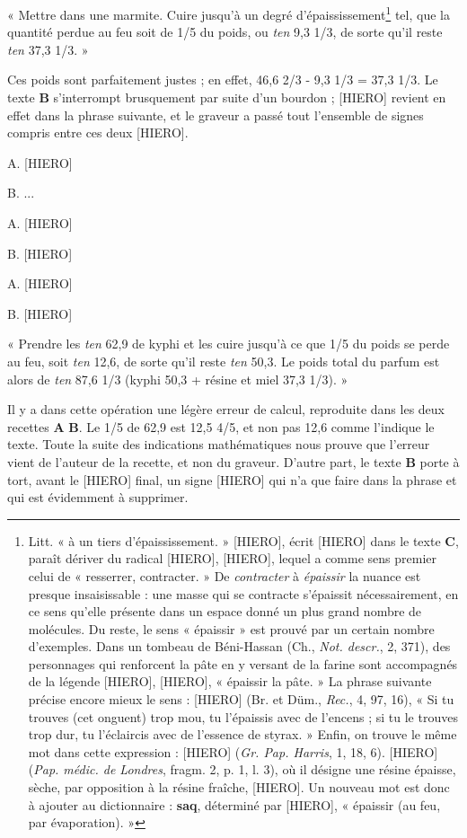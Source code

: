 \documentclass[a4paper, 11pt, oneside, landscape]{article}
\begin{document}
« Mettre dans une marmite. Cuire jusqu'à un degré d'épaississement\footnote{Litt. « à un tiers d'épaississement. » [HIERO], écrit [HIERO] dans le texte \textbf{C}, paraît dériver du radical [HIERO], [HIERO], lequel a comme sens premier celui de « resserrer, contracter. » De \emph{contracter} à \emph{épaissir} la nuance est presque insaisissable : une masse qui se contracte s'épaissit nécessairement, en ce sens qu'elle présente dans un espace donné un plus grand nombre de molécules. Du reste, le sens « épaissir » est prouvé par un certain nombre d'exemples. Dans un tombeau de Béni-Hassan (Ch., \emph{Not. descr.}, 2, 371), des personnages qui renforcent la pâte en y versant de la farine sont accompagnés de la légende [HIERO], [HIERO], « épaissir la pâte. » La phrase suivante précise encore mieux le sens : [HIERO] (Br. et Düm., \emph{Rec.}, 4, 97, 16), « Si tu trouves (cet onguent) trop mou, tu l'épaissis avec de l'encens ; si tu le trouves trop dur, tu l'éclaircis avec de l'essence de styrax. » Enfin, on trouve le même mot dans cette expression : [HIERO] (\emph{Gr. Pap. Harris}, 1, 18, 6). [HIERO] (\emph{Pap. médic. de Londres}, fragm. 2, p. 1, l. 3), où il désigne une résine épaisse, sèche, par opposition à la résine fraîche, [HIERO]. Un nouveau mot est donc à ajouter au dictionnaire : \textbf{saq}, déterminé par [HIERO], « épaissir (au feu, par évaporation). »} tel, que la quantité perdue au feu soit de 1/5 du poids, ou \emph{ten} 9,3 1/3, de sorte qu'il reste \emph{ten} 37,3 1/3. »

Ces poids sont parfaitement justes ; en effet, 46,6 2/3 - 9,3 1/3 = 37,3 1/3. Le texte \textbf{B} s'interrompt brusquement par suite d'un bourdon ; [HIERO] revient en effet dans la phrase suivante, et le graveur a passé tout l'ensemble de signes compris entre ces deux [HIERO]. 

A. [HIERO]

B. ...

A. [HIERO]

B. [HIERO]

A. [HIERO]

B. [HIERO]

« Prendre les \emph{ten} 62,9 de kyphi et les cuire jusqu'à ce que 1/5 du poids se perde au feu, soit \emph{ten} 12,6, de sorte qu'il reste \emph{ten} 50,3. Le poids total du parfum est alors de \emph{ten} 87,6 1/3 (kyphi 50,3 + résine et miel 37,3 1/3). »

Il y a dans cette opération une légère erreur de calcul, reproduite dans les deux recettes \textbf{A} \textbf{B}. Le 1/5 de 62,9 est 12,5 4/5, et non pas 12,6 comme l'indique le texte. Toute la suite des indications mathématiques nous prouve que l'erreur vient de l'auteur de la recette, et non du graveur. D'autre part, le texte \textbf{B} porte à tort, avant le [HIERO] final, un signe [HIERO] qui n'a que faire dans la phrase et qui est évidemment à supprimer.
\end{document}
